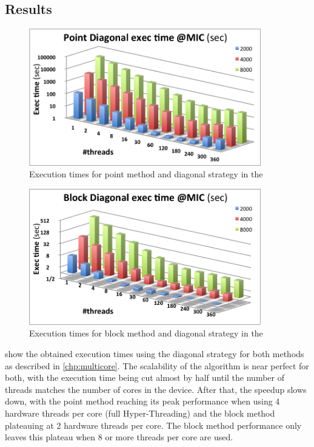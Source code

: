 \documentclass[../thesis]{subfiles}
\begin{document}
	\subsection{Results}
	\label{subsec:mic:native:results}

	\begin{figure}[htp]
		\begin{center}
			\includegraphics[width=0.9\textwidth]{assets/images/mic/point-diagonal.png}
		\end{center}
		\caption{Execution times for point method and diagonal strategy in the \intel\xeonphi}
		\label{fig:mic:point:diagonal:times}
	\end{figure}

	\begin{figure}[htp]
		\begin{center}
			\includegraphics[width=0.9\textwidth]{assets/images/mic/block-diagonal.png}
		\end{center}
		\caption{Execution times for block method and diagonal strategy in the \intel\xeonphi}
		\label{fig:mic:block:diagonal:times}
	\end{figure}

	 show the obtained execution times using the diagonal strategy for both methods as described in \cref{chp:multicore}. The scalability of the algorithm is near perfect for both, with the execution time being cut almost by half until the number of threads matches the number of cores in the device. After that, the speedup slows down, with the point method reaching its peak performance when using 4 hardware threads per core (full Hyper-Threading) and the block method plateauing at 2 hardware threads per core. The block method performance only leaves this plateau when 8 or more threads per core are used.
\end{document}
